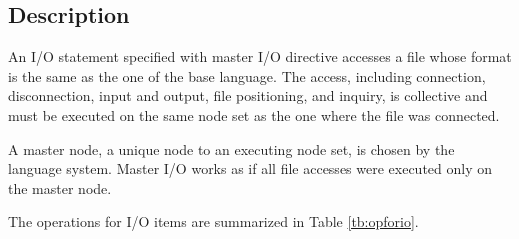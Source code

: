   \subsection*{Description}

   An I/O statement specified with master I/O directive accesses a
   file whose format is the same as the one of the base language.
   The access, including connection, disconnection, input and output,
   file positioning, and inquiry, is collective and must be
   executed on the same node set as the one where the file was
   connected. 

   A master node, a unique node to an executing node set, is chosen by the
   language system.
   Master I/O works as if all file accesses were executed only on the master
   node.

   The operations for I/O items are summarized in Table \ref{tb:opforio}.

